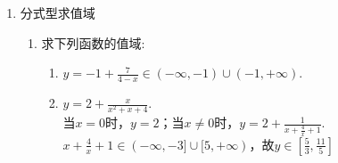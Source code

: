 \begin{enumerate}
\begin{enumerate}
\begin{jieda}
            $\forall x \in (\frac{\sqrt{5}-1}{2}, +\infty) , \exists t = \frac{1}{x+1} \in [0,\frac{\sqrt{5}-1}{2}), \quad s.t. f(x) = f(t)$ \\
            $\forall x \in [0,\frac{\sqrt{5}-1}{2}), \exists t = \frac{1}{x} - 1 \in (\frac{\sqrt{5}-1}{2}, +\infty), \quad  s.t. f(x) = f(t)$ \\
            但是$f(\frac{\sqrt{5}-1}{2})$可以和其他任意的函数值不相等。因此$a \geq \frac{\sqrt{5}-1}{2}$时满足$[0, a]$上$f(x)$的值域也是$A_f$
        \end{jieda}
    \end{enumerate}
    \item 分式型求值域
    \begin{enumerate}
        \item 求下列函数的值域: 
        \begin{jieda}
        \begin{enumerate}
        \item $y=-1+\frac{7}{4-x}\in(-\infty,-1)\cup(-1,+\infty)$. 
        
        \item $y=2+\frac{x}{x^2+x+4}$. \\
        当$x = 0$时，$y = 2$；当$x \neq 0$时，$y = 2 + \frac{1}{x + \frac{4}{x} + 1}$.\\
        $x + \frac{4}{x} + 1 \in (-\infty, -3]\cup [5, +\infty)$，故$y \in [\frac{5}{3}, \frac{11}{5}]$
        

\end{enumerate}
\end{jieda}
\end{enumerate}
\end{enumerate}
